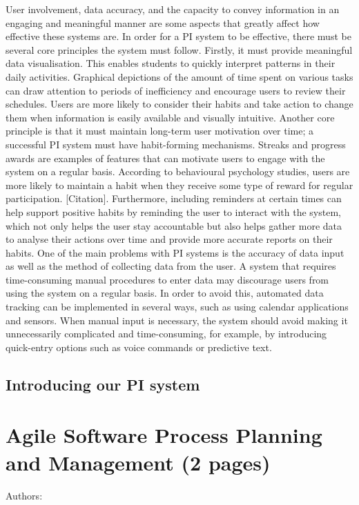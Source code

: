 \documentclass[12pt,a4paper]{article}
\begin{document}
User involvement, data accuracy, and the capacity to convey information in an engaging and meaningful manner are some aspects that greatly affect how effective these systems are. In order for a PI system to be effective, there must be several core principles the system must follow. Firstly, it must provide meaningful data visualisation. This enables students to quickly interpret patterns in their daily activities. Graphical depictions of the amount of time spent on various tasks can draw attention to periods of inefficiency and encourage users to review their schedules. Users are more likely to consider their habits and take action to change them when information is easily available and visually intuitive. Another core principle is that it must maintain long-term user motivation over time; a successful PI system must have habit-forming mechanisms. Streaks and progress awards are examples of features that can motivate users to engage with the system on a regular basis. According to behavioural psychology studies, users are more likely to maintain a habit when they receive some type of reward for regular participation. [Citation]. Furthermore, including reminders at certain times can help support positive habits by reminding the user to interact with the system, which not only helps the user stay accountable but also helps gather more data to analyse their actions over time and provide more accurate reports on their habits. One of the main problems with PI systems is the accuracy of data input as well as the method of collecting data from the user. A system that requires time-consuming manual procedures to enter data may discourage users from using the system on a regular basis.  In order to avoid this, automated data tracking can be implemented in several ways, such as using calendar applications and sensors. When manual input is necessary, the system should avoid making it unnecessarily complicated and time-consuming, for example, by introducing quick-entry options such as voice commands or predictive text.

\subsection{Introducing our PI system}

\label{sec:intro}


\section{Agile Software Process Planning and Management (2 pages)}
Authors:
\label{sec:agile}
\end{document}
